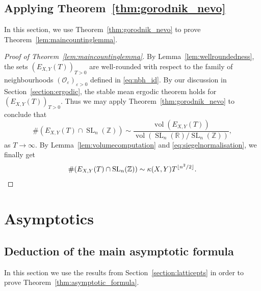\documentclass[11pt,reqno]{amsart}
\theoremstyle{definition}
\theoremstyle{remark}
\newcommand{\vol}{\operatorname{vol}}
\newcommand{\SL}{\operatorname{SL}}
\numberwithin{equation}{section}
\numberwithin{thm}{section}
\numberwithin{table}{section}
\def \R {{\mathbb R}}
\def \Z {{\mathbb Z}}
\begin{document}
\subsection{Applying Theorem~\ref{thm:gorodnik_nevo}}
In this section, we use  Theorem~\ref{thm:gorodnik_nevo} to prove Theorem~\ref{lem:maincountinglemma}.
\begin{proof}[Proof of Theorem~\ref{lem:maincountinglemma}]
    By Lemma~\ref{lem:wellroundedness}, the sets $(E_{X,Y}(T))_{T>0}$ are well-rounded with respect to the family of neighbourhoods $(\mathcal{O}_\varepsilon)_{\varepsilon>0}$ defined in \eqref{eq:nbh_id}. By our discussion in Section~\ref{section:ergodic}, the stable mean ergodic theorem holds for $(E_{X,Y}(T))_{T>0}$. Thus we may apply Theorem~\ref{thm:gorodnik_nevo} to conclude that 
    \[
     \# (E_{X,Y}(T) \cap \SL_n(\Z)) \sim \frac{\vol(E_{X, Y}(T))}{\vol (\SL_n(\R) / \SL_n(\Z))},
    \]
    as $T \to \infty$.
    By Lemma~\ref{lem:volumecomputation} and \eqref{eq:siegelnormalisation}, we finally get 
    \begin{equation*}
        \# (E_{X,Y}(T) \cap \SL_n(\Z)) \sim  \kappa (X,Y) T^{\lfloor n^2/2 \rfloor}.
     \qedhere
    \end{equation*}    
\end{proof}

\section{Asymptotics } \label{sec:asymp}


\subsection{Deduction of the main asymptotic formula}

In this section we use the results from  Section~\ref{section:latticepts} in order to prove Theorem~\ref{thm:asymptotic_formula}.
\end{document}
